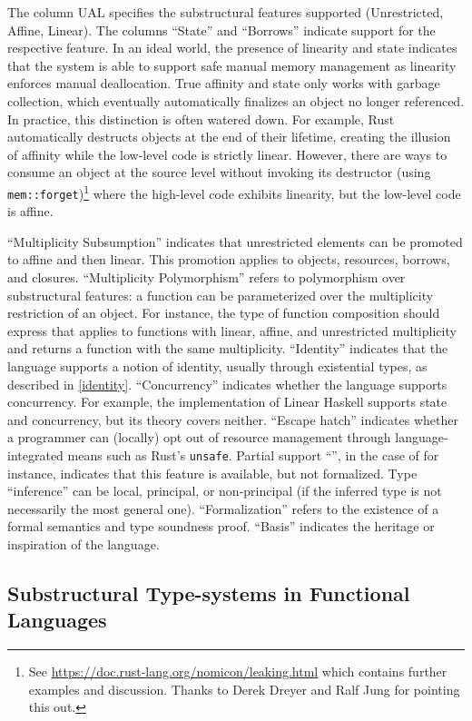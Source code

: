 The column UAL
specifies the substructural features supported (Unrestricted, Affine,
Linear). The columns ``State'' and ``Borrows'' indicate support for the respective
feature. In an ideal world, the presence of linearity and state
indicates that the system is able to support safe manual memory
management as linearity enforces manual deallocation. True affinity
and state only works with garbage collection, which eventually
automatically finalizes an object no longer referenced. In practice, this
distinction is often watered down. For example, Rust automatically
destructs objects at the end of their lifetime, creating the
illusion of affinity while the low-level code is strictly linear.
However, there are ways to consume an object at the source
level without invoking its destructor (using
\lstinline/mem::forget/)\footnote{See
  \url{https://doc.rust-lang.org/nomicon/leaking.html} which contains
  further examples and discussion. Thanks to
  Derek Dreyer and Ralf Jung for pointing this out.}
where the high-level code exhibits linearity, but the low-level code
is affine.

``Multiplicity Subsumption'' indicates that unrestricted elements 
can be promoted to affine and then linear. This promotion applies to
objects, resources, borrows, and closures. ``Multiplicity Polymorphism'' refers to polymorphism over
substructural features: a function can be parameterized over the multiplicity
restriction of an object. For instance, the type of function
composition should express that applies to functions with linear,
affine, and unrestricted multiplicity and returns a function with the
same multiplicity. 
``Identity'' indicates that the language supports a notion
of identity, usually through existential types, as described in
\cref{identity}.
``Concurrency'' indicates whether the language supports
concurrency. For example, the implementation of Linear Haskell
supports state and concurrency, but its theory covers neither.
``Escape hatch'' indicates whether a programmer can (locally) opt out of
resource management through language-integrated means such
as Rust's \texttt{unsafe}. Partial support ``\M'', in the case of \lang
for instance, indicates that this feature is available, but not formalized.
Type ``inference''  can be local, principal, or non-principal (if the
inferred type is not necessarily the most general one). ``Formalization''
refers to the existence of a formal semantics and type soundness
proof. ``Basis'' indicates the heritage or inspiration of the language.

\subsection{Substructural Type-systems in Functional Languages}

